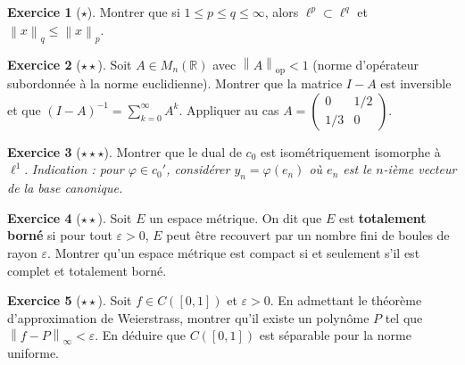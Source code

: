 \documentclass[a4paper,12pt]{book}
\newcommand{\R}{\mathbb{R}}
\newcommand{\norm}[1]{\left\| #1 \right\|}
\theoremstyle{definition}
\newtheorem{exercice}{Exercice}[chapter]
\theoremstyle{plain}
\theoremstyle{remark}
\begin{document}
\begin{exercice}[$\star$]\label{exo:ch1-inclusion-ell-p}
Montrer que si $1 \leq p \leq q \leq \infty$, alors $\ell^p \subset \ell^q$ et $\norm{x}_q \leq \norm{x}_p$.
\end{exercice}

\begin{exercice}[$\star\star$]\label{exo:ch1-neumann-application}
Soit $A \in M_n(\R)$ avec $\norm{A}_{\text{op}} < 1$ (norme d'opérateur subordonnée à la norme euclidienne). Montrer que la matrice $I - A$ est inversible et que $(I-A)^{-1} = \sum_{k=0}^\infty A^k$. Appliquer au cas $A = \begin{pmatrix} 0 & 1/2 \\ 1/3 & 0 \end{pmatrix}$.
\end{exercice}

\begin{exercice}[$\star\star\star$]\label{exo:ch1-dual-c0}
Montrer que le dual de $c_0$ est isométriquement isomorphe à $\ell^1$. \textit{Indication : pour $\varphi \in c_0'$, considérer $y_n = \varphi(e_n)$ où $e_n$ est le $n$-ième vecteur de la base canonique.}
\end{exercice}

\begin{exercice}[$\star\star$]\label{exo:ch1-compact-totborne}
Soit $E$ un espace métrique. On dit que $E$ est \textbf{totalement borné} si pour tout $\varepsilon > 0$, $E$ peut être recouvert par un nombre fini de boules de rayon $\varepsilon$. Montrer qu'un espace métrique est compact si et seulement s'il est complet et totalement borné.
\end{exercice}

\begin{exercice}[$\star\star$]\label{exo:ch1-densite-polynomes}
Soit $f \in C([0,1])$ et $\varepsilon > 0$. En admettant le théorème d'approximation de Weierstrass, montrer qu'il existe un polynôme $P$ tel que $\norm{f - P}_\infty < \varepsilon$. En déduire que $C([0,1])$ est séparable pour la norme uniforme.
\end{exercice}
\end{document}
